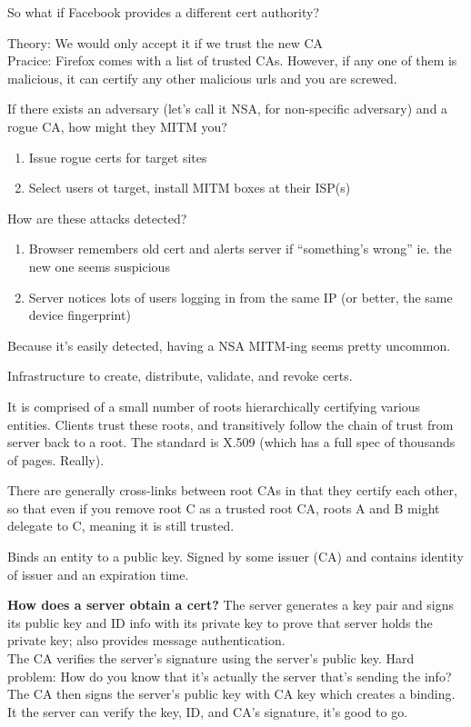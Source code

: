 So what if Facebook provides a different cert authority?

Theory: We would only accept it if we trust the new CA\\
Pracice: Firefox comes with a list of trusted CAs. However, if any one of them is malicious, it can certify any other malicious urls and you are screwed.

If there exists an adversary (let's call it NSA, for non-specific adversary) and
a rogue CA, how might they MITM you?

\begin{enumerate}
    \item Issue rogue certs for target sites
    \item Select users ot target, install MITM boxes at their ISP(s)
\end{enumerate}

How are these attacks detected?
\begin{enumerate}
    \item Browser remembers old cert and alerts server if ``something's wrong'' ie. the new one seems suspicious
    \item Server notices lots of users logging in from the same IP (or better, the same
    device fingerprint)
\end{enumerate}

Because it's easily detected, having a NSA MITM-ing seems pretty uncommon.

Infrastructure to create, distribute, validate, and revoke certs. 

It is comprised of a small number of roots hierarchically certifying various entities. 
Clients trust these roots, and transitively follow the chain of trust from server back 
to a root. The standard is X.509 (which has a full spec of thousands of pages. Really).

There are generally cross-links between root CAs in that they certify each other, so that even if you remove root C as a trusted root CA, roots A and B might delegate to C,
 meaning it is still trusted.

 Binds an entity to a public key. Signed by some issuer (CA) and contains identity of issuer and an expiration time.

 \textbf{How does a server obtain a cert?} The server generates a key pair and signs its public key and ID info with its private key to prove that server holds the private key; also provides message authentication.\\
 The CA verifies the server's signature using the server's public key. Hard problem: How do you know that it's actually the server that's sending the info?\\
 The CA then signs the server's public key with CA key which creates a binding. It the server can verify the key, ID, and CA's signature, it's good to go.

